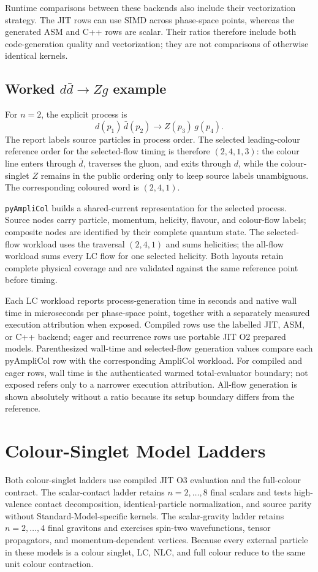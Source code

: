 \documentclass[10pt,letterpaper]{article}
\newif\ifReportLandscapePage
\newcommand{\PAC}{\texttt{pyAmpliCol}}
\newcommand{\ReportTableNote}[1]{\par\smallskip\noindent\footnotesize\textcolor{ReportMuted}{#1}\par}
\newcommand{\ReportLadderLegend}{\ReportTableNote{Each LC workload reports process-generation time in seconds and native wall time in microseconds per phase-space point, together with a separately measured execution attribution when exposed. Compiled rows use the labelled JIT, ASM, or C++ backend; eager and recurrence rows use portable JIT O2 prepared models. Parenthesized wall-time and selected-flow generation values compare each pyAmpliCol row with the corresponding AmpliCol workload. For compiled and eager rows, wall time is the authenticated warmed total-evaluator boundary; not exposed refers only to a narrower execution attribution. All-flow generation is shown absolutely without a ratio because its setup boundary differs from the reference.}}
\newcommand{\ReportLandscapeFooter}{}
\begin{document}
\begin{landscape}
Runtime comparisons between these backends also include their vectorization
strategy. The JIT rows can use SIMD across phase-space points, whereas the
generated ASM and C++ rows are scalar. Their ratios therefore include both
code-generation quality and vectorization; they are not comparisons of
otherwise identical kernels.

\subsection*{Worked \(d\bar d\to Zg\) example}

For \(n=2\), the explicit process is
\[
  d(p_1)\,\bar d(p_2)\to Z(p_3)\,g(p_4).
\]
The report labels source particles in process order. The selected leading-colour
reference order for the selected-flow timing is therefore \((2,4,1,3)\): the
colour line enters through \(\bar d\), traverses the gluon, and exits through
\(d\), while the colour-singlet \(Z\) remains in the public ordering only to
keep source labels unambiguous. The corresponding coloured word is
\((2,4,1)\).

\PAC{} builds a shared-current representation for the selected process. Source
nodes carry particle, momentum, helicity, flavour, and colour-flow labels;
composite nodes are identified by their complete quantum state. The
selected-flow workload uses the traversal \((2,4,1)\) and sums helicities; the
all-flow workload sums every LC flow for one selected helicity. Both layouts
retain complete physical coverage and are validated against the same reference
point before timing.

\clearpage

\clearpage

\ReportLadderLegend
\ReportLandscapeFooter
\end{landscape}
\ReportLandscapePagefalse
\clearpage
\pagestyle{fancy}

\section{Colour-Singlet Model Ladders}

Both colour-singlet ladders use compiled JIT O3 evaluation and the full-colour
contract. The scalar-contact ladder retains $n=2,\ldots,8$ final scalars and
tests high-valence contact decomposition, identical-particle normalization,
and source parity without Standard-Model-specific kernels. The scalar-gravity
ladder retains $n=2,\ldots,4$ final gravitons and exercises spin-two
wavefunctions, tensor propagators, and momentum-dependent vertices. Because
every external particle in these models is a colour singlet, LC, NLC, and full
colour reduce to the same unit colour contraction.
\end{document}
